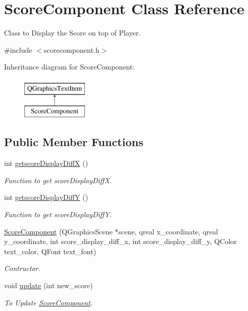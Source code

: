 \hypertarget{classScoreComponent}{\section{Score\-Component Class Reference}
\label{classScoreComponent}
}


Class to Display the Score on top of Player.  




{\ttfamily \#include $<$scorecomponent.\-h$>$}

Inheritance diagram for Score\-Component\-:\begin{figure}[H]
\begin{center}
\leavevmode
\includegraphics[height=2.000000cm]{classScoreComponent}
\end{center}
\end{figure}
\subsection*{Public Member Functions}
\begin{DoxyCompactItemize}
\item 
int \hyperlink{classScoreComponent_ac6ea09da203a3fa8424f4c0201629148}{getscore\-Display\-Diff\-X} ()
\begin{DoxyCompactList}\small\item\em Function to get score\-Display\-Diff\-X. \end{DoxyCompactList}\item 
int \hyperlink{classScoreComponent_a094c0593268e53b082f18a74a7774890}{getscore\-Display\-Diff\-Y} ()
\begin{DoxyCompactList}\small\item\em Function to get score\-Display\-Diff\-Y. \end{DoxyCompactList}\item 
\hyperlink{classScoreComponent_a39001d5cd9b6a7315d4bc9c9cf1b1383}{Score\-Component} (Q\-Graphics\-Scene $\ast$scene, qreal x\-\_\-coordinate, qreal y\-\_\-coordinate, int score\-\_\-display\-\_\-diff\-\_\-x, int score\-\_\-display\-\_\-diff\-\_\-y, Q\-Color text\-\_\-color, Q\-Font text\-\_\-font)
\begin{DoxyCompactList}\small\item\em Contructor. \end{DoxyCompactList}\item 
void \hyperlink{classScoreComponent_aa1d8f83108617d4e68209e480fb9964a}{update} (int new\-\_\-score)
\begin{DoxyCompactList}\small\item\em To Update \hyperlink{classScoreComponent}{Score\-Component}. \end{DoxyCompactList}\end{DoxyCompactItemize}
